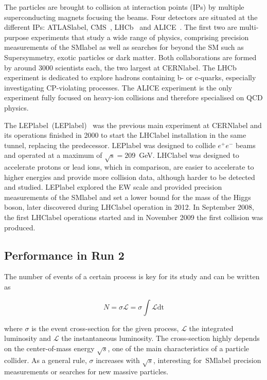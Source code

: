 The particles are brought to collision at interaction points (IPs) by multiple superconducting magnets focusing the beams. Four detectors are situated at the different IPs: \acrshort{ATLASlabel}, CMS~\cite{CMSmachine}, LHCb~\cite{LHCbmachine} and ALICE~\cite{ALICEmachine}. The first two are multi-purpose experiments that study a wide range of physics, comprising precision measurements of the \acrshort{SMlabel} as well as searches for beyond the SM such as Supersymmetry, exotic particles or dark matter. Both collaborations are formed by around 3000 scientists each, the two largest at \acrshort{CERNlabel}. The LHCb experiment is dedicated to explore hadrons containing b- or c-quarks, especially investigating CP-violating processes. The ALICE experiment is the only experiment fully focused on heavy-ion collisions and therefore specialised on QCD physics. 

The \acrlong{LEPlabel}~(\acrshort{LEPlabel})~\cite{LEPmachine} was the previous main experiment at \acrshort{CERNlabel} and its operations finished in 2000 to start the \acrshort{LHClabel} installation in the same tunnel, replacing the predecessor. \acrshort{LEPlabel} was designed to collide $e^+e^-$ beams and operated at a maximum of $\sqrt{\text{s}}=209$~GeV. \acrshort{LHClabel} was designed to accelerate protons or lead ions, which in comparison, are easier to accelerate to higher energies and provide more collision data, although harder to be detected and studied. \acrshort{LEPlabel} explored the \acrshort{EW} scale and provided precision measurements of the \acrshort{SMlabel} and set a lower bound for the mass of the Higgs boson, later discovered during \acrshort{LHClabel} operation in 2012. In September 2008, the first \acrshort{LHClabel} operations started and in November 2009 the first collision was produced. 

\subsection{Performance in Run 2}

The number of events of a certain process is key for its study and can be written as

\begin{equation}
    N = \sigma\mathscr{L} = \sigma \int \mathcal{L} \text{dt}
\end{equation}

where $\sigma$ is the event cross-section for the given process, $\mathscr{L}$ the integrated luminosity and $\mathcal{L}$ the instantaneous luminosity. The cross-section highly depends on the center-of-mass energy $\sqrt{s}$, one of the main characteristics of a particle collider. As a general rule, $\sigma$ increases with $\sqrt{s}$, interesting for~\acrshort{SMlabel} precision measurements or searches for new massive particles.

